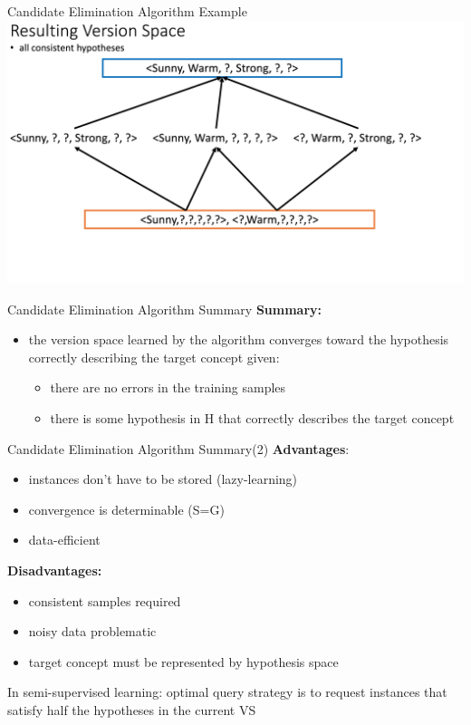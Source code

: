 \documentclass{beamer}
\begin{document}
\begin{frame}{Candidate Elimination Algorithm Example}
\centering
\includegraphics[width=1.1\textwidth]{cea_7}
\end{frame}

\begin{frame}{Candidate Elimination Algorithm Summary}
\textbf{Summary:}

\begin{itemize}
\item the version space learned by the algorithm converges toward the hypothesis correctly describing the target concept given:
	\begin{itemize}
	\item there are no errors in the training samples
    \item there is some hypothesis in H that correctly describes the target concept
	\end{itemize}
\end{itemize}

\end{frame}

\begin{frame}{Candidate Elimination Algorithm Summary(2)}
\textbf{Advantages}:
\begin{itemize}
\item instances don't have to be stored (lazy-learning)
\item convergence is determinable (S=G) 
\item data-efficient
\end{itemize}

\textbf{Disadvantages:}
\begin{itemize}
\item consistent samples required
\item noisy  data problematic
\item target concept must be represented by hypothesis space
\end{itemize}

In semi-supervised learning: optimal query strategy is to request instances that satisfy half the hypotheses in the current VS
\end{frame}
\end{document}
